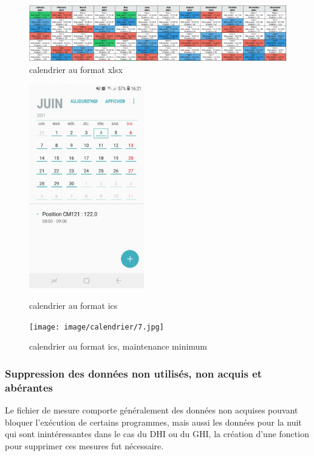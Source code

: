 \documentclass[12pt,a4paper]{article}
\begin{document}
\begin{flushleft}
\begin{figure}[H]
\centering
\includegraphics[width=16cm]{image/calendrier/2.PNG} 
\caption{calendrier au format xlsx}  
\end{figure}


\begin{figure}[H]
    \begin{minipage}[c]{.46\linewidth}
        \centering
        \includegraphics[width=5cm]{image/calendrier/4.jpg} 
		\caption{calendrier au format ics}
    \end{minipage}
    \hfill%
    \begin{minipage}[c]{.46\linewidth}
        \centering
        \texttt{[image: image/calendrier/7.jpg]} 
        \caption{calendrier au format ics, maintenance minimum}
    \end{minipage}
\end{figure}

\subsubsection{Suppression des données non utilisés, non acquis et abérantes}

Le fichier de mesure comporte généralement des données non acquises pouvant bloquer l'exécution de certains programmes, mais aussi les données pour la nuit qui sont inintéressantes dans le cas du DHI ou du GHI, la création d'une fonction pour supprimer ces mesures fut nécessaire.


\end{flushleft}
\end{document}
